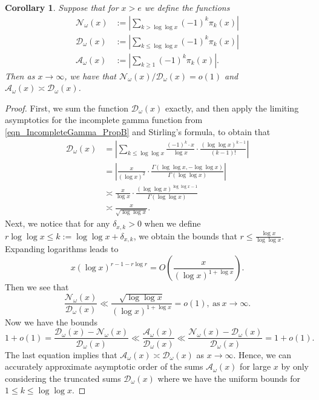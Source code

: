 \documentclass[11pt,reqno,a4letter]{article}
\numberwithin{figure}{section}
\numberwithin{table}{section}
\theoremstyle{plain}
\newtheorem{cor}[theorem]{Corollary}
\numberwithin{theorem}{section}
\theoremstyle{definition}
\begin{document}
\begin{cor}
\label{cor_AsymptoticsForSignedSumsOfomegan_v1} 
Suppose that for $x > e$ we define the functions 
\begin{align*} 
\mathcal{N}_{\omega}(x) & := \left\lvert \sum_{k > \log\log x} (-1)^{k} \pi_k(x) \right\rvert \\ 
\mathcal{D}_{\omega}(x) & := \left\lvert \sum_{k \leq \log\log x} (-1)^{k} \pi_k(x) \right\rvert \\ 
\mathcal{A}_{\omega}(x) & := \left\lvert \sum_{k \geq 1} (-1)^{k} \pi_k(x) \right\rvert. 
\end{align*} 
Then as $x \rightarrow \infty$, we have that $\mathcal{N}_{\omega}(x) / \mathcal{D}_{\omega}(x) = o(1)$ 
and $\mathcal{A}_{\omega}(x) \asymp \mathcal{D}_{\omega}(x)$. 
\end{cor} 
\begin{proof} 
First, we sum the function $\mathcal{D}_{\omega}(x)$ exactly, and then apply the limiting 
asymptotics for the incomplete gamma function from 
\eqref{eqn_IncompleteGamma_PropB} and Stirling's formula, to obtain that 
\begin{align*} 
\mathcal{D}_{\omega}(x) & = \left\lvert \sum_{k \leq \log\log x} \frac{(-1)^k \cdot x}{\log x} \cdot 
     \frac{(\log\log x)^{k-1}}{(k-1)!} \right\rvert \\ 
     & = \left\lvert \frac{x}{(\log x)^2} \cdot \frac{\Gamma(\log\log x, -\log\log x)}{ 
     \Gamma(\log\log x)} \right\rvert \\ 
     & \asymp \frac{x}{\log x} \cdot \frac{(\log\log x)^{\log\log x - 1}}{\Gamma(\log\log x)} \\ 
     & \asymp \frac{x}{\sqrt{\log\log x}}. 
\end{align*} 
Next, we notice that for any $\delta_{x,k} > 0$ when we define 
$r\log\log x \leq k := \log\log x + \delta_{x,k}$, we obtain the bounds that 
$r \leq \frac{\log x}{\log\log x}$. Expanding logarithms leads to 
\[
x (\log x)^{r - 1 - r \log r} = O\left(\frac{x}{(\log x)^{1 + \log x}}\right). 
\]
Then we see that 
\[
\frac{\mathcal{N}_{\omega}(x)}{\mathcal{D}_{\omega}(x)} \ll 
     \frac{\sqrt{\log\log x}}{(\log x)^{1 + \log x}} = o(1), 
     \mathrm{\ as\ } x \rightarrow \infty. 
\]
Now we have the bounds 
\[
1+o(1) = \frac{\mathcal{D}_{\omega}(x)-\mathcal{N}_{\omega}(x)}{\mathcal{D}_{\omega}(x)} \ll 
     \frac{\mathcal{A}_{\omega}(x)}{\mathcal{D}_{\omega}(x)} \ll 
     \frac{\mathcal{N}_{\omega}(x)-\mathcal{D}_{\omega}(x)}{\mathcal{D}_{\omega}(x)} = 
     1 + o(1). 
\]
The last equation implies that 
$\mathcal{A}_{\omega}(x) \asymp \mathcal{D}_{\omega}(x)$ as $x \rightarrow \infty$. 
Hence, we can accurately approximate asymptotic order of 
the sums $\mathcal{A}_{\omega}(x)$ for large $x$ by only considering the truncated sums 
$\mathcal{D}_{\omega}(x)$ where we have the uniform bounds for 
$1 \leq k \leq \log\log x$. 
\end{proof} 
\end{document}
